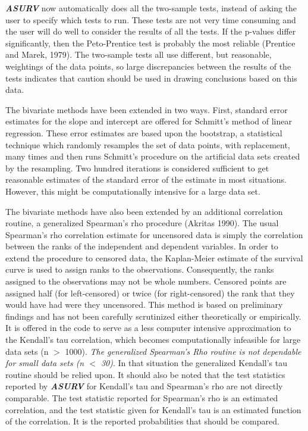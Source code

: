      {\sl\bf ASURV} now automatically does all the two-sample tests, 
instead of asking the user to specify which tests to run.  These tests 
are not very time consuming and the user will do well to consider 
the results of all the tests.  If the p-values differ significantly, 
then the Peto-Prentice test is probably the most reliable (Prentice 
and Marek, 1979).  The two-sample tests all use different, but 
reasonable, weightings of the data points, so large discrepancies 
between the results of the tests indicates that caution should be 
used in drawing conclusions based on this data.


     The bivariate methods have been extended in two ways.  First,
standard error estimates for the slope and intercept are offered for
Schmitt's method of linear regression.  These error estimates are
based upon the bootstrap, a statistical technique which randomly 
resamples the set of data points, with replacement, many times
and then runs Schmitt's procedure on the artificial data sets created by the
resampling.  Two hundred iterations is considered sufficient to get reasonable 
estimates of the standard error of the estimate in most situations.  
However, this might be computationally intensive for a large data set.

     
     The bivariate methods have also been extended by an
additional correlation routine, a generalized Spearman's rho procedure 
(Akritas 1990).  The usual Spearman's rho correlation estimate for uncensored 
data is simply the correlation between the ranks of the independent and 
dependent variables.  In order to extend the procedure to censored data, the
Kaplan-Meier estimate of the survival curve is used to assign ranks to the
observations.  Consequently, the ranks assigned to the observations may not 
be whole numbers.  Censored points are assigned half (for left-censored)
or twice (for right-censored) the rank that they would have had were
they uncensored.  This method is based on preliminary findings and 
has not been carefully scrutinized either theoretically or empirically.  It is
offered in the code to serve as a less computer intensive approximation to the
Kendall's tau correlation, which becomes computationally infeasible for large 
data sets (n $>$ 1000).  {\it The generalized Spearman's Rho routine is not 
dependable for small data sets (n $<$ 30)}.  In that situation the generalized
Kendall's tau routine should be relied upon.  It should also be noted that 
the test statistics reported by {\sl\bf ASURV} for Kendall's tau and Spearman's
rho are not directly comparable.  The test statistic reported for Spearman's
rho is an estimated correlation, and the test statistic given for Kendall's
tau is an estimated function of the correlation.  It is the reported
probabilities that should be compared.

